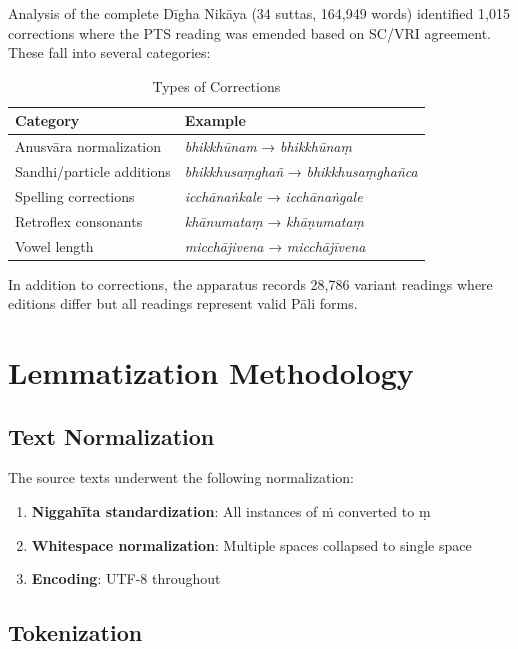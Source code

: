 \documentclass[unnumsec,webpdf,contemporary,large]{oup-authoring-template}
\begin{document}
Analysis of the complete Dīgha Nikāya (34 suttas, 164,949 words) identified 1,015 corrections where the PTS reading was emended based on SC/VRI agreement. These fall into several categories:

\begin{table}[h]
\centering
\caption{Types of Corrections}
\begin{tabular}{ll}
\toprule
Category & Example \\
\midrule
Anusvāra normalization & \emph{bhikkhūnam} → \emph{bhikkhūnaṃ} \\
Sandhi/particle additions & \emph{bhikkhusaṃghañ} → \emph{bhikkhusaṃghañca} \\
Spelling corrections & \emph{icchānaṅkale} → \emph{icchānaṅgale} \\
Retroflex consonants & \emph{khānumataṃ} → \emph{khāṇumataṃ} \\
Vowel length & \emph{micchājivena} → \emph{micchājīvena} \\
\bottomrule
\end{tabular}
\end{table}

In addition to corrections, the apparatus records 28,786 variant readings where editions differ but all readings represent valid Pāli forms.

\section{Lemmatization Methodology}

\subsection{Text Normalization}

The source texts underwent the following normalization:

\begin{enumerate}
\item \textbf{Niggahīta standardization}: All instances of ṁ converted to ṃ
\item \textbf{Whitespace normalization}: Multiple spaces collapsed to single space
\item \textbf{Encoding}: UTF-8 throughout
\end{enumerate}

\subsection{Tokenization}
\end{document}
